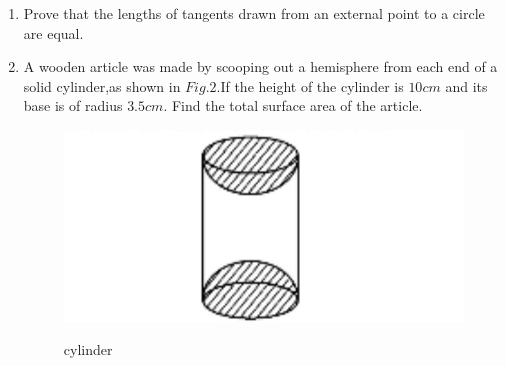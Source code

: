 \documentclass{article}
\begin{document}
\begin{enumerate}
	(OR)
		If the area of two similar triangles are equal,prove that they are congruent.
\item Prove that the lengths of tangents drawn from an external point to a circle are equal.
\item A wooden article was made by scooping out a hemisphere from each end of a solid cylinder,as shown in $Fig.2$.If the height of the cylinder is $10cm$ and its base is of radius $3.5cm$. Find the total surface area of the article.\\
	\begin{figure}[H]
		\centering
		\includegraphics [width=\columnwidth] {./IMAGE2.jpg}
		\label{fig:fig2}
		\caption{cylinder}
	\end{figure}
	

\end{enumerate}
\end{document}
